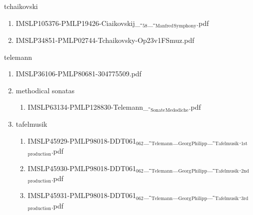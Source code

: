 \documentclass[11pt]{article}
\begin{document}
\item tchaikovski
\label{sec-1-1-1-1-44-68}
\begin{enumerate}
\item IMSLP105376-PMLP19426-Ciaikovskij\_-$_{\text{58}}$\_-$_{\text{Manfred}}$$_{\text{Symphony}}$.pdf
\label{sec-1-1-1-1-44-68-1}

\item IMSLP34851-PMLP02744-Tchaikovsky-Op23v1FSmuz.pdf
\label{sec-1-1-1-1-44-68-2}
\end{enumerate}

\item telemann
\label{sec-1-1-1-1-44-69}
\begin{enumerate}
\item IMSLP36106-PMLP80681-304775509.pdf
\label{sec-1-1-1-1-44-69-1}

\item methodical sonatas
\label{sec-1-1-1-1-44-69-2}
\begin{enumerate}
\item IMSLP63134-PMLP128830-Telemann\_-$_{\text{Sonate}}$$_{\text{Medodiche}}$.pdf
\label{sec-1-1-1-1-44-69-2-1}
\end{enumerate}

\item tafelmusik
\label{sec-1-1-1-1-44-69-3}
\begin{enumerate}
\item IMSLP45929-PMLP98018-DDT061$_{\text{062}}$\_-$_{\text{Telemann}}$\_$_{\text{Georg}}$$_{\text{Philipp}}$\_-$_{\text{Tafelmusik}}$.$_{\text{1st}}$$_{\text{production}}$.pdf
\label{sec-1-1-1-1-44-69-3-1}

\item IMSLP45930-PMLP98018-DDT061$_{\text{062}}$\_-$_{\text{Telemann}}$\_$_{\text{Georg}}$$_{\text{Philipp}}$\_-$_{\text{Tafelmusik}}$.$_{\text{2nd}}$$_{\text{production}}$.pdf
\label{sec-1-1-1-1-44-69-3-2}

\item IMSLP45931-PMLP98018-DDT061$_{\text{062}}$\_-$_{\text{Telemann}}$\_$_{\text{Georg}}$$_{\text{Philipp}}$\_-$_{\text{Tafelmusik}}$.$_{\text{3rd}}$$_{\text{production}}$.pdf
\label{sec-1-1-1-1-44-69-3-3}
\end{enumerate}
\end{enumerate}
\end{document}
